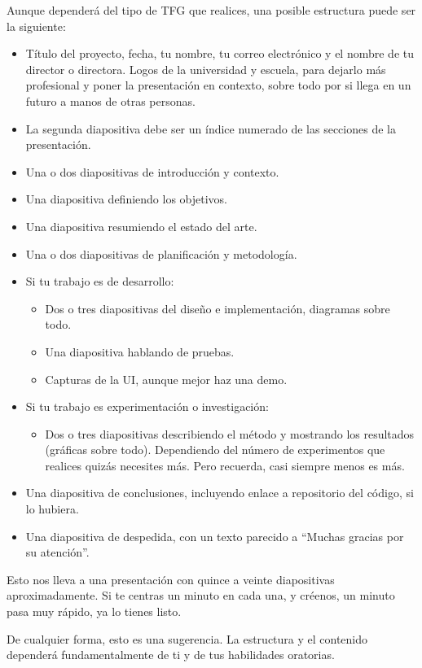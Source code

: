 Aunque dependerá del tipo de TFG que realices, una posible estructura puede ser la siguiente:
\begin{itemize}
\item Título del proyecto, fecha, tu nombre, tu correo electrónico y el nombre de tu director o directora. Logos de la universidad y escuela, para dejarlo más profesional y poner la presentación en contexto, sobre todo por si llega en un futuro a manos de otras personas.
\item La segunda diapositiva debe ser un índice numerado de las secciones de la presentación.
\item Una o dos diapositivas de introducción y contexto.
\item Una diapositiva definiendo los objetivos.
\item Una diapositiva resumiendo el estado del arte.
\item Una o dos diapositivas de planificación y metodología.
\item Si tu trabajo es de desarrollo:
    \begin{itemize}
    \item Dos o tres diapositivas del diseño e implementación, diagramas sobre todo.
    \item Una diapositiva hablando de pruebas.
    \item Capturas de la UI, aunque mejor haz una demo.
    \end{itemize}
\item Si tu trabajo es experimentación o investigación:
    \begin{itemize}
        \item Dos o tres diapositivas describiendo el método y mostrando los resultados (gráficas sobre todo). Dependiendo del número de experimentos que realices quizás necesites más. Pero recuerda, casi siempre menos es más.
    \end{itemize}
\item Una diapositiva de conclusiones, incluyendo enlace a repositorio del código, si lo hubiera.
\item Una diapositiva de despedida, con un texto parecido a ``Muchas gracias por su atención''.
\end{itemize}

Esto nos lleva a una presentación con quince a veinte diapositivas aproximadamente. Si te centras un minuto en cada una, y créenos, un minuto pasa muy rápido, ya lo tienes listo. 

De cualquier forma, esto es una sugerencia. La estructura y el contenido dependerá fundamentalmente de ti y de tus habilidades oratorias. 

